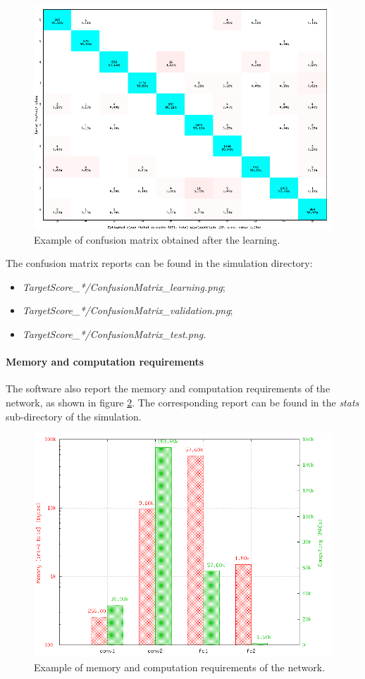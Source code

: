 \documentclass[a4paper,11pt,oneside]{article}
\newenvironment{myitemize}
{ \begin{itemize}
    \setlength{\itemsep}{0pt}
    \setlength{\parskip}{0pt}
    \setlength{\parsep}{0pt}     }
{ \end{itemize}                  }
\begin{document}
\begin{figure}[!htb]
  \centering
  \includegraphics[width=0.8\linewidth]{figs/confusion_matrix.png}
  \caption{Example of confusion matrix obtained after the learning.}
  \label{fig:ConfusionMatrix}
\end{figure}

The confusion matrix reports can be found in the simulation directory:
\begin{myitemize}
\item \emph{TargetScore\_*/ConfusionMatrix\_learning.png};
\item \emph{TargetScore\_*/ConfusionMatrix\_validation.png};
\item \emph{TargetScore\_*/ConfusionMatrix\_test.png}.
\end{myitemize}

\paragraph{Memory and computation requirements}

The software also report the memory and computation requirements of the network,
 as shown in figure \ref{fig:stats}. The corresponding report can be found in
 the \emph{stats} sub-directory of the simulation.

\begin{figure}[!htb]
  \centering
  \includegraphics[width=0.8\linewidth]{figs/stats.png}
  \caption{Example of memory and computation requirements of the network.}
  \label{fig:stats}
\end{figure}
\end{document}

